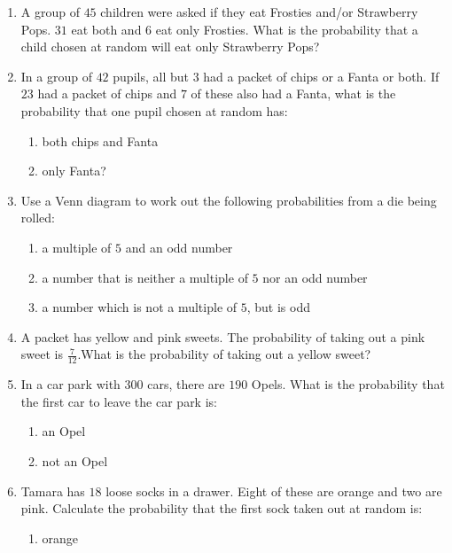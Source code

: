 \begin{eocexercises}{}
  \begin{enumerate}[itemsep=5pt, label=\textbf{\arabic*}. ]
  \item A group of $45$ children were asked if they eat Frosties and/or
    Strawberry Pops. $31$ eat both and $6$ eat only Frosties. What is the
    probability that a child chosen at random will eat only Strawberry
    Pops?
  \item In a group of $42$ pupils, all but $3$ had a packet of chips
    or a Fanta or both. If $23$ had a packet of chips and $7$ of these
    also had a Fanta, what is the probability that one pupil chosen at
    random has:
    \begin{enumerate}[noitemsep, label=\textbf{(\alph*)} ]
    \item both chips and Fanta
    \item only Fanta?
    \end{enumerate}
  \item Use a Venn diagram to work out the following probabilities
    from a die being rolled:
    \begin{enumerate}[noitemsep, label=\textbf{(\alph*)} ]
    \item a multiple of $5$ and an odd number
    \item a number that is neither a multiple of $5$ nor an odd
      number
    \item a number which is not a multiple of $5$, but is odd
    \end{enumerate}
  \item A packet has yellow and pink sweets. The probability of taking
    out a pink sweet is $\frac{7}{12}$.What is the probability of taking out a yellow sweet?
  \item In a car park with $300$ cars, there are $190$ Opels. What is the
    probability that the first car to leave the car park is:
    \begin{enumerate}[noitemsep, label=\textbf{(\alph*)} ]
    \item an Opel
    \item not an Opel
    \end{enumerate}
  \item Tamara has $18$ loose socks in a drawer. Eight of these are
    orange and two are pink. Calculate the probability that the first
    sock taken out at random is:
    \begin{enumerate}[noitemsep, label=\textbf{(\alph*)} ]
    \item orange

\end{enumerate}
\end{enumerate}
\end{eocexercises}
